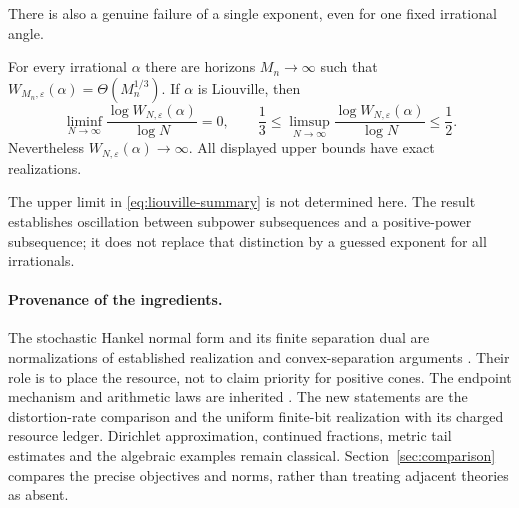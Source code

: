 There is also a genuine failure of a single exponent, even for one fixed irrational angle.
\begin{theorem}\label{thm:liouville-main}
For every irrational $\alpha$ there are horizons $M_n\to\infty$ such that
$W_{M_n,\varepsilon}(\alpha)=\Theta(M_n^{1/3})$. If $\alpha$ is Liouville, then
\begin{equation}\label{eq:liouville-summary}
 \liminf_{N\to\infty}\frac{\log W_{N,\varepsilon}(\alpha)}{\log N}=0,
 \qquad
 \frac13\le\limsup_{N\to\infty}\frac{\log W_{N,\varepsilon}(\alpha)}{\log N}
 \le\frac12.
\end{equation}
Nevertheless $W_{N,\varepsilon}(\alpha)\to\infty$. All displayed upper bounds have exact realizations.
\end{theorem}

The upper limit in \eqref{eq:liouville-summary} is not determined here. The result establishes oscillation between subpower subsequences and a positive-power subsequence; it does not replace that distinction by a guessed exponent for all irrationals.


\paragraph{Provenance of the ingredients.}
The stochastic Hankel normal form and its finite separation dual are
normalizations of established realization and convex-separation
arguments \cite{BF04,Ohta20,BPP15}. Their role is to place the resource,
not to claim priority for positive cones. The endpoint mechanism and
arithmetic laws are inherited \cite{GTF35,GTF42,GTF43}. The new statements
are the distortion-rate comparison and the uniform finite-bit
realization with its charged resource ledger. Dirichlet approximation,
continued fractions, metric tail estimates and the algebraic examples
remain classical. Section~\ref{sec:comparison} compares the precise
objectives and norms, rather than treating adjacent theories as absent.
